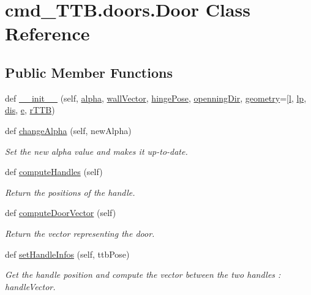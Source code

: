 \hypertarget{classcmd__TTB_1_1doors_1_1Door}{}\section{cmd\+\_\+\+T\+T\+B.\+doors.\+Door Class Reference}
\label{classcmd__TTB_1_1doors_1_1Door}
\subsection*{Public Member Functions}
\begin{DoxyCompactItemize}
\item 
def \hyperlink{classcmd__TTB_1_1doors_1_1Door_a8a5131d58a6a161426ac54899963d40e}{\+\_\+\+\_\+init\+\_\+\+\_\+} (self, \hyperlink{classcmd__TTB_1_1doors_1_1Door_a5a5ba84424f74f473c3d4db493fbfe8c}{alpha}, \hyperlink{classcmd__TTB_1_1doors_1_1Door_a4004e9f386328abd8dd549878d2bd9f8}{wall\+Vector}, \hyperlink{classcmd__TTB_1_1doors_1_1Door_acb238f97ae19a85d9ea3cbf97b010cb8}{hinge\+Pose}, \hyperlink{classcmd__TTB_1_1doors_1_1Door_a8c669d6f1e191e3807a4eeffedbfb094}{openning\+Dir}, \hyperlink{classcmd__TTB_1_1doors_1_1Door_a01b6754c275f7145c1c95f3062883503}{geometry}=\mbox{[}\hyperlink{classcmd__TTB_1_1doors_1_1Door_a16fa05c6bb89c77f16b20499e48bb163}{l}, \hyperlink{classcmd__TTB_1_1doors_1_1Door_a07616d26f3df6efd4b51b199d408c494}{lp}, \hyperlink{classcmd__TTB_1_1doors_1_1Door_abcf8527d55a058f835abdb3780fe28cc}{dis}, \hyperlink{classcmd__TTB_1_1doors_1_1Door_a3f30afe81c6f5496a150396786edafef}{e}, \hyperlink{classcmd__TTB_1_1doors_1_1Door_a4ee8a303c778727a2b64a9bee7fa5b0a}{r\+T\+TB})
\item 
def \hyperlink{classcmd__TTB_1_1doors_1_1Door_a08dd5fdda89e5f7eb8cd1ca3a37de595}{change\+Alpha} (self, new\+Alpha)
\begin{DoxyCompactList}\small\item\em Set the new alpha value and makes it up-\/to-\/date. \end{DoxyCompactList}\item 
def \hyperlink{classcmd__TTB_1_1doors_1_1Door_a997736278601660535cb8dc7e5ccc322}{compute\+Handles} (self)
\begin{DoxyCompactList}\small\item\em Return the positions of the handle. \end{DoxyCompactList}\item 
def \hyperlink{classcmd__TTB_1_1doors_1_1Door_a49444ceaf9044929d8209c2dd8a26ccc}{compute\+Door\+Vector} (self)
\begin{DoxyCompactList}\small\item\em Return the vector representing the door. \end{DoxyCompactList}\item 
def \hyperlink{classcmd__TTB_1_1doors_1_1Door_a9694212289f52f6f6e8521ec819eb86a}{set\+Handle\+Infos} (self, ttb\+Pose)
\begin{DoxyCompactList}\small\item\em Get the handle position and compute the vector between the two handles \+: handle\+Vector. \end{DoxyCompactList}\end{DoxyCompactItemize}
